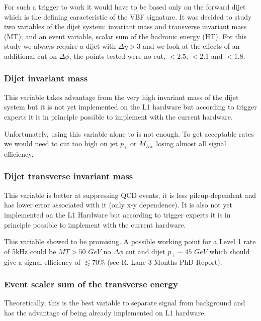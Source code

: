 
For such a trigger to work it would have to be based only on the forward dijet which is the defining caracteristic
of the VBF signature.
It was decided to study two variables of the dijet system: invariant mass and transverse invariant mass (MT); and an event 
variable, scalar sum of the hadronic energy (HT). For this study we always require a dijet with $\Delta\eta>3$ and we 
look at the effects of an additional cut on $\Delta\phi$, the points tested were no cut, $<2.5$, $<2.1$ and $<1.8$.

\subsubsection{Dijet invariant mass}

This variable takes advantage from the very high invariant mass of the dijet system but it is not yet implemented
on the L1 hardware but according to trigger experts it is in principle possible to implement with the current hardware.

Unfortunately, using this variable alone to is not enough. To get acceptable rates we would need to cut too high on
jet $p_\bot$ or $M_{Inv}$ losing almost all signal efficiency.

\subsubsection{Dijet transverse invariant mass}

This variable is better at suppressing QCD events, it is less pileup-dependent and has lower error associated with it
(only x-y dependence). It is also not yet implemented on the L1 Hardware but according to trigger experts it is in principle 
possible to implement with the current hardware.

This variable showed to be promising. A possible working point for a Level 1 rate
of 5kHz could be $MT>50$ $GeV$ no $\Delta\phi$ cut and dijet $p_\bot \sim 45$ $GeV$ which should give a signal
efficiency of $\lesssim70\%$ (see R. Lane 3 Months PhD Report).

\subsubsection{Event scaler sum of the transverse energy}

Theoretically, this is the best variable to separate signal from background and has the advantage of being already
implemented on L1 hardware.

